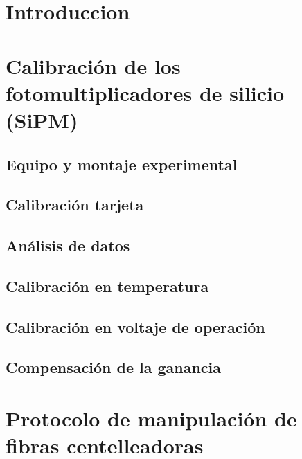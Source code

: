 \documentclass[11pt,a4paper]{article}
\begin{document}

%

\tableofcontents
\newpage


\section{Introduccion}  \label{sec:ch01}


\section{Calibración de los fotomultiplicadores de silicio (SiPM)} \label{sec:ch02}

	\subsection{Equipo y montaje experimental}
	
	
	\subsection{Calibración tarjeta}
	
	
	\subsection{Análisis de datos}
	
	
	\subsection{Calibración en temperatura}
	

	\subsection{Calibración en voltaje de operación}
	
	
	\subsection{Compensación de la ganancia}
	


\section{Protocolo de manipulación de fibras centelleadoras} \label{sec:ch03}

\end{document}
